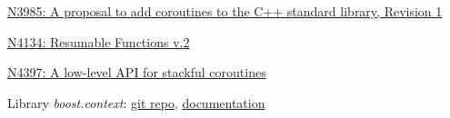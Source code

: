 \begin{thebibliography}{99}

        \href{http://www.open-std.org/jtc1/sc22/wg21/docs/papers/2014/n3985.pdf}
        {N3985: A proposal to add coroutines to the C++ standard library, Revision 1}

        \href{http://www.open-std.org/jtc1/sc22/wg21/docs/papers/2014/n4134.pdf}
        {N4134: Resumable Functions v.2}

        \href{http://www.open-std.org/jtc1/sc22/wg21/docs/papers/2015/n4397.pdf}
        {N4397: A low-level API for stackful coroutines}

        Library \emph{boost.context}:
        \href{https://github.com/boostorg/context} {git repo},
        \href{http://www.boost.org/doc/libs/1_58_0/libs/context/doc/html/index.html} {documentation}

\end{thebibliography}
